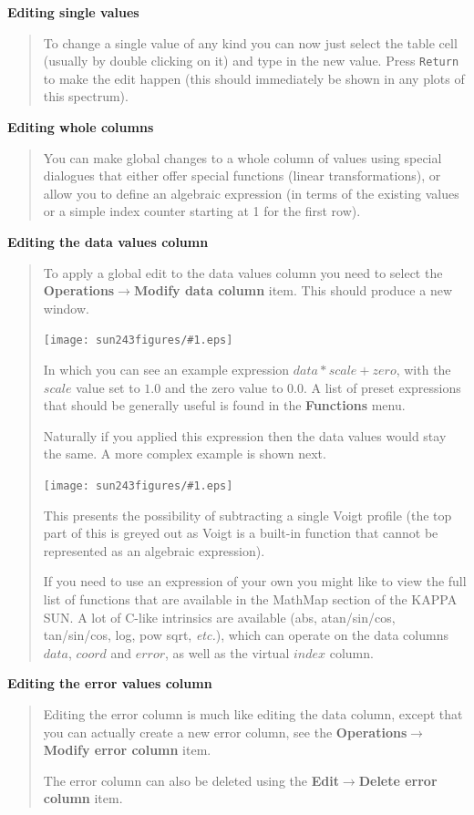 \documentclass[twoside,11pt]{article}
\newcommand{\htmladdimg}[1]{}
\newcommand{\latexhtml}[2]{#1}
\newcommand{\xref}[3]{#1}
\renewcommand{\_}{\texttt{\symbol{95}}}
\newcommand{\mainfigure}[1]
{\begin{center}
 \latexhtml{\texttt{[image: sun243\_figures/\#1.eps]}}{\htmladdimg{#1.gif}}
 \end{center}
}
\newcommand{\menuitem}[1]{\textbf{#1}}
\newcommand{\submenuitem}[2]{\latexhtml{\textbf{#1$\rightarrow$#2}}{\textbf{#1->#2}}}
\newcommand{\hitext}[1]{\texttt{#1}}
\newcommand{\etc}{\textit{etc.}}
\newcommand{\subheading}[1]{\textbf{\large{#1}}}
\begin{document}
\subheading{Editing single values}
\begin{quote}
 To change a single value of any kind you can now just select the
 table cell (usually by double clicking on it) and type in the new
 value. Press \hitext{Return} to make the edit happen (this should
 immediately be shown in any plots of this spectrum).
\end{quote}

\subheading{Editing whole columns}
\begin{quote}
 You can make global changes to a whole column of values using special
 dialogues that either offer special functions (linear transformations),
 or allow you to define an algebraic expression (in terms of the
 existing values or a simple index counter starting at 1 for the first
 row).
\end{quote}

\subheading{Editing the data values column}
\begin{quote}
 To apply a global edit to the data values column you need to select
 the \submenuitem{Operations}{Modify data column} item. This should
 produce a new window.

 \mainfigure{dataeditwindow}

 In which you can see an example expression $data*scale+zero$, with
 the $scale$ value set to $1.0$ and the zero value to $0.0$. A list of
 preset expressions that should be generally useful is found in the
 \menuitem{Functions} menu.

 Naturally if you applied this expression then the data values would
 stay the same. A more complex example is shown next.

 \mainfigure{dataeditwindow2}

 This presents the possibility of subtracting a single Voigt profile
 (the top part of this is greyed out as Voigt is a built-in function
 that cannot be represented as an algebraic expression).

 If you need to use an expression of your own you might like to view
 the full list of functions that are available in the MathMap section
 of the \xref{KAPPA SUN}{sun95}{ap_MathMaps}. A lot of C-like
 intrinsics are available (abs, atan/sin/cos, tan/sin/cos, log, pow
 sqrt, \etc), which can operate on the data columns $data$, $coord$
 and $error$, as well as the virtual $index$ column.
\end{quote}

\subheading{Editing the error values column}
\begin{quote}
 Editing the error column is much like editing the data column, except
 that you can actually create a new error column, see the
 \submenuitem{Operations}{Modify error column} item.

 The error column can also be deleted using the
 \submenuitem{Edit}{Delete error column} item.
\end{quote}
\end{document}
